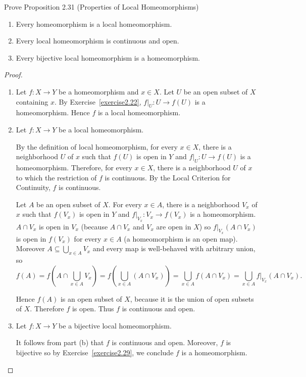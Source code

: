 \begin{exercise}{2.32}
	Prove Proposition 2.31 (Properties of Local Homeomorphisms)
	\begin{enumerate}[label={(\alph*)}]
		\item Every homeomorphism is a local homeomorphism.
		\item Every local homeomorphism is continuous and open.
		\item Every bijective local homeomorphism is a homeomorphism.
	\end{enumerate}
\end{exercise}

\begin{proof}
	\begin{enumerate}[label={(\alph*)}]
		\item Let $f: X\to Y$ be a homeomorphism and $x\in X$. Let $U$ be an open subset of $X$ containing $x$. By Exercise~\ref{exercise2.22}, $f\vert_{U}: U\to f(U)$ is a homeomorphism. Hence $f$ is a local homeomorphism.
		\item Let $f: X\to Y$ be a local homeomorphism.

		      By the definition of local homeomorphism, for every $x\in X$, there is a neighborhood $U$ of $x$ such that $f(U)$ is open in $Y$ and $f\vert_{U}: U\to f(U)$ is a homeomorphism. Therefore, for every $x\in X$, there is a neighborhood $U$ of $x$ to which the restriction of $f$ is continuous. By the Local Criterion for Continuity, $f$ is continuous.

		      Let $A$ be an open subset of $X$. For every $x\in A$, there is a neighborhood $V_{x}$ of $x$ such that $f(V_{x})$ is open in $Y$ and $f\vert_{V_{x}}: V_{x}\to f(V_{x})$ is a homeomorphism. $A\cap V_{x}$ is open in $V_{x}$ (because $A\cap V_{x}$ and $V_{x}$ are open in $X$) so $f\vert_{V_{x}}(A\cap V_{x})$ is open in $f(V_{x})$ for every $x\in A$ (a homeomorphism is an open map). Moreover $A\subseteq \bigcup_{x\in A}V_{x}$ and every map is well-behaved with arbitrary union, so
		      \[
			      f(A) = f\left(A\cap \bigcup_{x\in A}V_{x}\right) = f\left(\bigcup_{x\in A}(A\cap V_{x})\right) = \bigcup_{x\in A} f(A\cap V_{x}) = \bigcup_{x\in A} f\vert_{V_{x}}(A\cap V_{x}).
		      \]

		      Hence $f(A)$ is an open subset of $X$, because it is the union of open subsets of $X$. Therefore $f$ is open. Thus $f$ is continuous and open.
		\item Let $f: X\to Y$ be a bijective local homeomorphism.

		      It follows from part (b) that $f$ is continuous and open. Moreover, $f$ is bijective so by Exercise~\ref{exercise2.29}, we conclude $f$ is a homeomorphism.
	\end{enumerate}
\end{proof}

